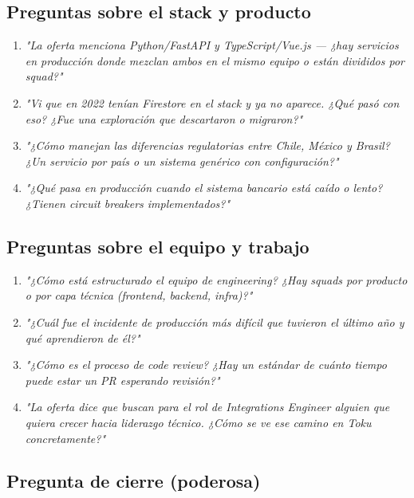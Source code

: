 \documentclass[11pt,a4paper]{article}
\begin{document}
\subsection{Preguntas sobre el stack y producto}

\begin{enumerate}[leftmargin=*]
  \item \textit{"La oferta menciona Python/FastAPI y TypeScript/Vue.js — ¿hay servicios en producción
  donde mezclan ambos en el mismo equipo o están divididos por squad?"}

  \item \textit{"Vi que en 2022 tenían Firestore en el stack y ya no aparece. ¿Qué pasó con eso?
  ¿Fue una exploración que descartaron o migraron?"}

  \item \textit{"¿Cómo manejan las diferencias regulatorias entre Chile, México y Brasil?
  ¿Un servicio por país o un sistema genérico con configuración?"}

  \item \textit{"¿Qué pasa en producción cuando el sistema bancario está caído o lento?
  ¿Tienen circuit breakers implementados?"}
\end{enumerate}

\subsection{Preguntas sobre el equipo y trabajo}

\begin{enumerate}[leftmargin=*]
  \item \textit{"¿Cómo está estructurado el equipo de engineering? ¿Hay squads por producto
  o por capa técnica (frontend, backend, infra)?"}

  \item \textit{"¿Cuál fue el incidente de producción más difícil que tuvieron el último año
  y qué aprendieron de él?"}

  \item \textit{"¿Cómo es el proceso de code review? ¿Hay un estándar de cuánto tiempo
  puede estar un PR esperando revisión?"}

  \item \textit{"La oferta dice que buscan para el rol de Integrations Engineer alguien
  que quiera crecer hacia liderazgo técnico. ¿Cómo se ve ese camino en Toku concretamente?"}
\end{enumerate}

\subsection{Pregunta de cierre (poderosa)}
\end{document}
